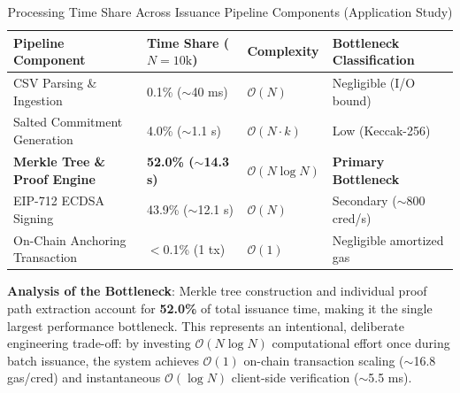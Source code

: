\begin{table}[H]
\centering
\renewcommand{\arraystretch}{1.25}
\begin{tabular}{|p{4.8cm}|p{3.0cm}|p{2.8cm}|p{4.2cm}|}
\hline
\textbf{Pipeline Component} & \textbf{Time Share ($N=10\text{k}$)} & \textbf{Complexity} & \textbf{Bottleneck Classification} \\
\hline
CSV Parsing \& Ingestion & 0.1\% ($\sim$40 ms) & $\mathcal{O}(N)$ & Negligible (I/O bound) \\
\hline
Salted Commitment Generation & 4.0\% ($\sim$1.1 s) & $\mathcal{O}(N \cdot k)$ & Low (Keccak-256) \\
\hline
\textbf{Merkle Tree \& Proof Engine} & \textbf{52.0\% ($\sim$14.3 s)} & $\mathcal{O}(N \log N)$ & \textbf{Primary Bottleneck} \\
\hline
EIP-712 ECDSA Signing & 43.9\% ($\sim$12.1 s) & $\mathcal{O}(N)$ & Secondary ($\sim$800 cred/s) \\
\hline
On-Chain Anchoring Transaction & $<$0.1\% (1 tx) & $\mathcal{O}(1)$ & Negligible amortized gas \\
\hline
\end{tabular}
\caption{Processing Time Share Across Issuance Pipeline Components (Application Study)}
\label{tab:bottleneck-breakdown}
\end{table}

\textbf{Analysis of the Bottleneck}:
Merkle tree construction and individual proof path extraction account for \textbf{52.0\%} of total issuance time, making it the single largest performance bottleneck. This represents an intentional, deliberate engineering trade-off: by investing $\mathcal{O}(N \log N)$ computational effort once during batch issuance, the system achieves $\mathcal{O}(1)$ on-chain transaction scaling ($\sim$16.8 gas/cred) and instantaneous $\mathcal{O}(\log N)$ client-side verification ($\sim$5.5 ms).

